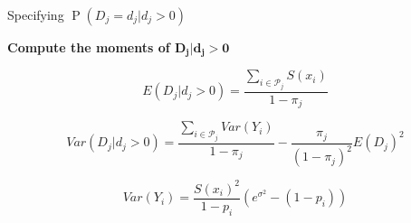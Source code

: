 \documentclass[
  10pt,
  ignorenonframetext,
]{beamer}
\begin{document}
\begin{frame}{Specifying
\(\operatorname{P}\left(D_j=d_{j} \vert d_j > 0 \right)\)}
\protect\hypertarget{specifying-operatornamepleftd_jd_j-vert-d_j-0-right}{}

\normalsize

\textbf{Compute the moments of $\mathbf{D_j\vert d_j > 0}$}

\footnotesize

\[E(D_j \vert d_j > 0)=\frac{\sum_{i \in \mathcal{P}_j} S(x_{i})}{1-\pi_j}\]

\[Var(D_j \vert d_j > 0) = \frac{\sum_{i \in \mathcal{P}_j} Var(Y_{i})}{1-\pi_j} - \frac{\pi_j}{(1-\pi_j)^2}E(D_j)^2\]

\[Var(Y_{i})=\frac{S(x_{i})^2}{1-p_{i}}(e^{\sigma^2}-(1-p_{i}))\]

\vspace{\baselineskip}
\vspace{\baselineskip}

\normalsize


\end{frame}
\end{document}
